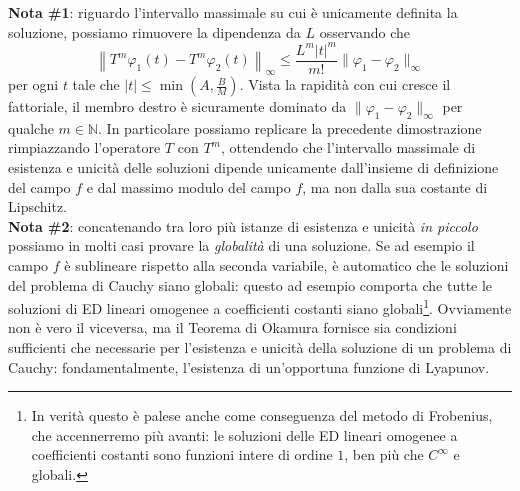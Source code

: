 \documentclass[a4paper,twoside]{article}
\newcommand{\N}{\mathbb{N}}
\theoremstyle{definition}
\numberwithin{theorem}{section}
\begin{document}
\textbf{Nota \#1}: riguardo l'intervallo massimale su cui è unicamente definita la soluzione, possiamo rimuovere la dipendenza da $L$ osservando che 
$$ \left\| T^m \varphi_1(t)- T^m\varphi_2(t)\right\|_{\infty}\leq \frac{L^m|t|^m}{m!}\|\varphi_1-\varphi_2\|_{\infty} $$
per ogni $t$ tale che $|t|\leq\min\left(A,\frac{B}{M}\right)$. Vista la rapidità con cui cresce il fattoriale, il membro destro è sicuramente dominato da $\|\varphi_1-\varphi_2\|_{\infty} $ per qualche $m\in\N$. In particolare possiamo replicare la precedente dimostrazione rimpiazzando l'operatore $T$ con $T^m$, ottendendo che l'intervallo massimale di esistenza e unicità delle soluzioni dipende unicamente dall'insieme di definizione del campo $f$ e dal massimo modulo del campo $f$, ma non dalla sua costante di Lipschitz.\\

\textbf{Nota \#2}: concatenando tra loro più istanze di esistenza e unicità \emph{in piccolo} possiamo in molti casi provare la \emph{globalità} di una soluzione. Se ad esempio il campo $f$ è sublineare rispetto alla seconda variabile, è automatico che le soluzioni del problema di Cauchy siano globali: questo ad esempio comporta che tutte le soluzioni di ED lineari omogenee a coefficienti costanti siano globali\footnote{In verità questo è palese anche come conseguenza del metodo di Frobenius, che accennerremo più avanti: le soluzioni delle ED lineari omogenee a coefficienti costanti sono funzioni intere di ordine $1$, ben più che $C^{\infty}$ e globali.}. Ovviamente non è vero il viceversa, ma il Teorema di Okamura fornisce sia condizioni sufficienti che necessarie per l'esistenza e unicità della soluzione di un problema di Cauchy: fondamentalmente, l'esistenza di un'opportuna funzione di Lyapunov.
\end{document}
